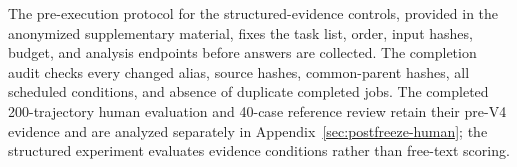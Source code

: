 The pre-execution protocol for the structured-evidence controls, provided in the anonymized supplementary material, fixes the task list, order, input hashes, budget, and analysis endpoints before answers are collected. The completion audit checks every changed alias, source hashes, common-parent hashes, all scheduled conditions, and absence of duplicate completed jobs. The completed 200-trajectory human evaluation and 40-case reference review retain their pre-V4 evidence and are analyzed separately in Appendix~\ref{sec:postfreeze-human}; the structured experiment evaluates evidence conditions rather than free-text scoring.
